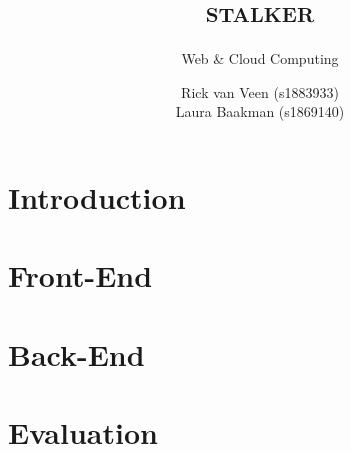 \documentclass{report}
\title{\textsc{stalker}}
\subtitle{Web \& Cloud Computing}
\author{Rick van Veen (s1883933)\\Laura Baakman (s1869140)}
\begin{document}
\maketitle

\chapter*{Introduction}
\label{ch:intro}


\chapter{Front-End}
\label{ch:frontend}


\chapter{Back-End}
\label{ch:backend}


\chapter{Evaluation}
\label{ch:eval}


\printbibliography
\end{document}
